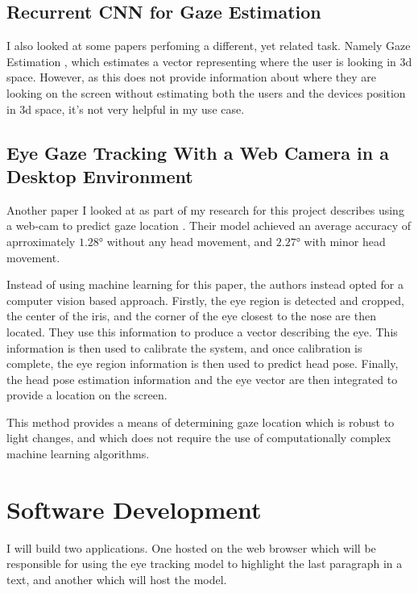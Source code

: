 \documentclass[twocolumn]{report}
\begin{document}
\subsection{Recurrent CNN for Gaze Estimation}

I also looked at some papers perfoming a different, yet related task. Namely Gaze Estimation \cite{palmero2018recurrent}, which estimates a vector representing where the user is looking in 3d space. However, as this does not provide information about where they are looking on the screen without estimating both the users and the devices position in 3d space, it's not very helpful in my use case. 

\subsection{Eye Gaze Tracking With a Web Camera in a Desktop Environment} 

Another paper I looked at as part of my research for this project describes using a web-cam to predict gaze location \cite{yiuming2015eyegazetracking}. Their model achieved an average accuracy of aprroximately $\ang{1.28}$ without any head movement, and $\ang{2.27}$ with minor head movement. 

Instead of using machine learning for this paper, the authors instead opted for a computer vision based approach. Firstly, the eye region is detected and cropped, the center of the iris, and the corner of the eye closest to the nose are then located. They use this information to produce a vector describing the eye. This information is then used to calibrate the system, and once calibration is complete, the eye region information is then used to predict head pose. Finally, the head pose estimation information and the eye vector are then integrated to provide a location on the screen. 

This method provides a means of determining gaze location which is robust to light changes, and which does not require the use of computationally complex machine learning algorithms. 

\section{Software Development}\label{sec:software-dev}

I will build two applications. One hosted on the web browser which will be responsible for using the eye tracking model to highlight the last paragraph in a text, and another which will host the model. 
\end{document}
